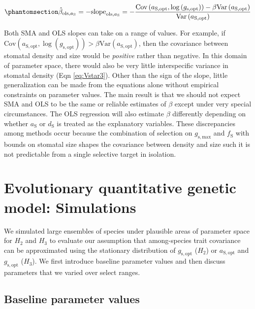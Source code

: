 \documentclass[
  letterpaper,
  DIV=11,
  numbers=noendperiod]{scrartcl}
\begin{document}
\begin{equation}\phantomsection\label{eq-est-ols23}{\hat{\beta}_{\text{ols},a_\mathrm{S}} = -\text{slope}_{\text{ols},a_\mathrm{S}} =-\frac{\text{Cov} \left(a_\mathrm{S,opt}, \log \left(g_\mathrm{s,opt} \right) \right) - \beta \text{Var} \left( a_\mathrm{S,opt} \right)}{\text{Var} \left( a_{\mathrm{S,opt}}\right)}}\end{equation}

Both SMA and OLS slopes can take on a range of values. For example, if
\(\text{Cov} \left( a_\mathrm{S,opt}, \log \left( g_\mathrm{s,opt} \right) \right) > \beta \text{Var} \left(a_\mathrm{S,opt} \right)\),
then the covariance between stomatal density and size would be
\emph{positive} rather than negative. In this domain of parameter space,
there would also be very little interspecific variance in stomatal
density (Eqn \ref{eq:Vstar3}). Other than the sign of the slope, little
generalization can be made from the equations alone without empirical
constraints on parameter values. The main result is that we should not
expect SMA and OLS to be the same or reliable estimates of \(\beta\)
except under very special circumstances. The OLS regression will also
estimate \(\beta\) differently depending on whether \(a_\mathrm{S}\) or
\(d_\mathrm{S}\) is treated as the explanatory variables. These
discrepancies among methods occur because the combination of selection
on \(g_\mathrm{s,max}\) and \(f_\mathrm{S}\) with bounds on stomatal
size shapes the covariance between density and size such it is not
predictable from a single selective target in isolation.

\section{Evolutionary quantitative genetic model:
Simulations}\label{sec-simulations}

We simulated large ensembles of species under plausible areas of
parameter space for \(H_2\) and \(H_3\) to evaluate our assumption that
among-species trait covariance can be approximated using the stationary
distribution of \(g_\mathrm{s,opt}\) (\(H_2\)) or \(a_\mathrm{S,opt}\)
and \(g_\mathrm{s,opt}\) (\(H_3\)). We first introduce baseline
parameter values and then discuss parameters that we varied over select
ranges.

\subsection{Baseline parameter values}\label{baseline-parameter-values}
\end{document}
